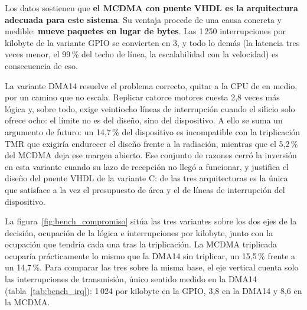 Los datos sostienen que \textbf{el MCDMA con puente VHDL es la arquitectura adecuada para este
sistema}. Su ventaja procede de una causa concreta y medible: \textbf{mueve paquetes en lugar de
bytes}. Las 1\,250 interrupciones por kilobyte de la variante GPIO se convierten en 3, y todo lo
demás (la latencia tres veces menor, el 99\,\% del techo de línea, la escalabilidad con la
velocidad) es consecuencia de eso.

La variante DMA14 resuelve el problema correcto, quitar a la CPU de en medio, por un camino que no
escala. Replicar catorce motores cuesta 2,8 veces más lógica y, sobre todo, exige veintiocho
líneas de interrupción cuando el silicio solo ofrece ocho: el límite no es del diseño, sino del
dispositivo. A ello se suma un argumento de futuro: un 14,7\,\% del dispositivo es incompatible
con la triplicación TMR que exigiría endurecer el diseño frente a la radiación, mientras que el
5,2\,\% del MCDMA deja ese margen abierto. Ese conjunto de razones cerró la inversión en esta
variante cuando su lazo de recepción no llegó a funcionar, y justifica el diseño del puente VHDL
de la variante C: de las tres arquitecturas es la única que satisface a la vez el presupuesto de
área y el de líneas de interrupción del dispositivo.

La figura~\ref{fig:bench_compromiso} sitúa las tres variantes sobre los dos ejes de la decisión,
ocupación de la lógica e interrupciones por kilobyte, junto con la ocupación que tendría cada una
tras la triplicación. La MCDMA triplicada ocuparía prácticamente lo mismo que la DMA14 sin
triplicar, un 15,5\,\% frente a un 14,7\,\%. Para comparar las tres sobre la misma base, el eje
vertical cuenta solo las interrupciones de transmisión, único sentido medido en la DMA14
(tabla~\ref{tab:bench_irq}): 1\,024 por kilobyte en la GPIO, 3,8 en la DMA14 y 8,6 en la MCDMA.

